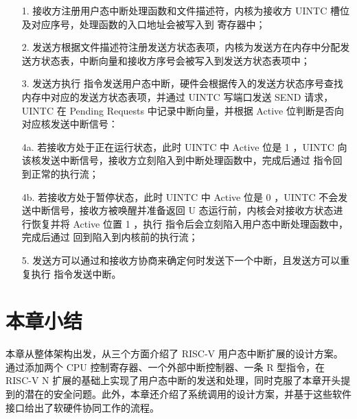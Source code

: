\begin{itemize}
    \item[1.] 接收方注册用户态中断处理函数和文件描述符，内核为接收方 UINTC 槽位及对应序号，处理函数的入口地址会被写入到 \Rutvec 寄存器中；
    \item[2.] 发送方根据文件描述符注册发送方状态表项，内核为发送方在内存中分配发送方状态表，中断向量和接收方序号会被写入到发送方状态表项中；
    \item[3.] 发送方执行 \Iuipisend 指令发送用户态中断，硬件会根据传入的发送方状态序号查找内存中对应的发送方状态表项，并通过 UINTC 写端口发送 SEND 请求，UINTC 在 Pending Requests 中记录中断向量，并根据 Active 位判断是否向对应核发送中断信号：
    \item[4a.] 若接收方处于正在运行状态，此时 UINTC 中 Active 位是 1 ，UINTC 向该核发送中断信号，接收方立刻陷入到中断处理函数中，完成后通过 \Iuret 指令回到正常的执行流；
    \item[4b.] 若接收方处于暂停状态，此时 UINTC 中 Active 位是 0 ，UINTC 不会发送中断信号，接收方被唤醒并准备返回 U 态运行前，内核会对接收方状态进行恢复并将 Active 位置 1 ，执行 \Isret 指令后会立刻陷入用户态中断处理函数中，完成后通过 \Iuret 回到陷入到内核前的执行流；
    \item[5.] 发送方可以通过和接收方协商来确定何时发送下一个中断，且发送方可以重复执行 \Iuipisend 指令发送中断。 
\end{itemize}

\section{本章小结}

本章从整体架构出发，从三个方面介绍了 RISC-V 用户态中断扩展的设计方案。通过添加两个 CPU 控制寄存器、一个外部中断控制器、一条 R 型指令，在 RISC-V N 扩展的基础上实现了用户态中断的发送和处理，同时克服了本章开头提到的潜在的安全问题。此外，本章还介绍了系统调用的设计方案，并基于这些软件接口给出了软硬件协同工作的流程。